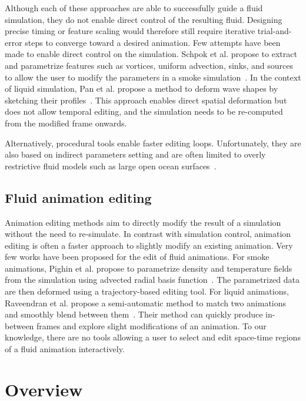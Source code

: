 Although each of these approaches are able to successfully guide a fluid simulation, they do not enable direct control of the resulting fluid. 
Designing precise timing or feature scaling would therefore still require iterative trial-and-error steps to converge toward a desired animation.
Few attempts have been made to enable direct control on the simulation. 
Schpok et al. propose to extract and parametrize features such as vortices, uniform advection, sinks, and sources to allow the user to modify the parameters in a smoke simulation~\cite{Schpok2005}.
In the context of liquid simulation, Pan et al. propose a method to deform wave shapes by sketching their profiles~\cite{Pan2013}.
This approach enables direct spatial deformation but does not allow temporal editing, and the simulation needs to be re-computed from the modified frame onwards.

Alternatively, procedural tools enable faster editing loops. 
Unfortunately, they are also based on indirect parameters setting and are often limited to overly restrictive fluid models such as large open ocean surfaces~\cite{hinsinger2002,Tessendorf2004,jeschke2015water,horvath2015empirical}.

\subsection{Fluid animation editing}
Animation editing methods aim to directly modify the result of a simulation without the need to re-simulate. In contrast with simulation control, animation editing is often a faster approach to slightly modify an existing animation. Very few works have been proposed for the edit of fluid animations. 
For smoke animations, Pighin et al. propose to parametrize density and temperature fields from the simulation using advected radial basis function~\cite{Pighin2004}.
The parametrized data are then deformed using a trajectory-based editing tool. 
For liquid animations, Raveendran et al. propose a semi-automatic method to match two animations and smoothly blend between them~\cite{Raveendran2014}.
Their method can quickly produce in-between frames and explore slight modifications of an animation. To our knowledge, there are no tools allowing a user to select and edit space-time regions of a fluid animation interactively.

\section{Overview}\label{sec:overview}

